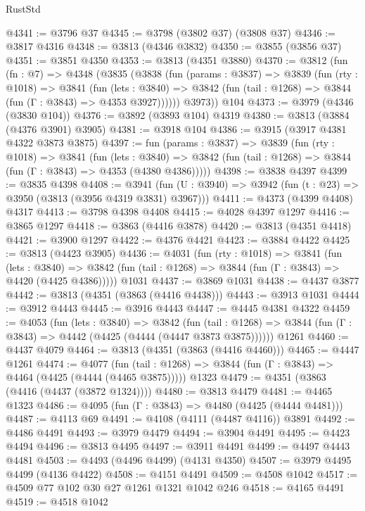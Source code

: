 \begin{lexlean}{RustStd}
\begin{coremodule}
@4341 := @3796 @37
@4345 := @3798 (@3802 @37) (@3808 @37)
@4346 := @3817 @4316
@4348 := @3813 (@4346 @3832)
@4350 := @3855 (@3856 @37)
@4351 := @3851 @4350
@4353 := @3813 (@4351 @3880)
@4370 := @3812
    (fun (fn : @7) =>
    @4348
      (@3835
        (@3838
          (fun (params : @3837) =>
          @3839
            (fun (rty : @1018) =>
            @3841
              (fun (lets : @3840) =>
              @3842 (fun (tail : @1268) => @3844 (fun (Γ : @3843) => @4353 @3927))))))
        @3973))
    @104
@4373 := @3979 (@4346 (@3830 @104))
@4376 := @3892 (@3893 @104) @4319
@4380 := @3813 (@3884 (@4376 @3901) @3905)
@4381 := @3918 @104
@4386 := @3915 (@3917 @4381 @4322 @3873 @3875)
@4397 := fun (params : @3837) =>
  @3839
    (fun (rty : @1018) =>
    @3841
      (fun (lets : @3840) =>
      @3842 (fun (tail : @1268) => @3844 (fun (Γ : @3843) => @4353 (@4380 @4386)))))
@4398 := @3838 @4397
@4399 := @3835 @4398
@4408 := @3941 (fun (U : @3940) => @3942 (fun (t : @23) => @3950 (@3813 (@3956 @4319 @3831) @3967)))
@4411 := @4373 (@4399 @4408) @4317
@4413 := @3798 @4398 @4408
@4415 := @4028 @4397 @1297
@4416 := @3865 @1297
@4418 := @3863 (@4416 @3878)
@4420 := @3813 (@4351 @4418)
@4421 := @3900 @1297
@4422 := @4376 @4421
@4423 := @3884 @4422
@4425 := @3813 (@4423 @3905)
@4436 := @4031
    (fun (rty : @1018) =>
    @3841
      (fun (lets : @3840) =>
      @3842 (fun (tail : @1268) => @3844 (fun (Γ : @3843) => @4420 (@4425 @4386)))))
    @1031
@4437 := @3869 @1031
@4438 := @4437 @3877
@4442 := @3813 (@4351 (@3863 (@4416 @4438)))
@4443 := @3913 @1031
@4444 := @3912 @4443
@4445 := @3916 @4443
@4447 := @4445 @4381 @4322
@4459 := @4053
    (fun (lets : @3840) =>
    @3842
      (fun (tail : @1268) => @3844 (fun (Γ : @3843) => @4442 (@4425 (@4444 (@4447 @3873 @3875))))))
    @1261
@4460 := @4437 @4079
@4464 := @3813 (@4351 (@3863 (@4416 @4460)))
@4465 := @4447 @1261
@4474 := @4077
    (fun (tail : @1268) => @3844 (fun (Γ : @3843) => @4464 (@4425 (@4444 (@4465 @3875)))))
    @1323
@4479 := @4351 (@3863 (@4416 (@4437 (@3872 @1324))))
@4480 := @3813 @4479
@4481 := @4465 @1323
@4486 := @4095 (fun (Γ : @3843) => @4480 (@4425 (@4444 @4481)))
@4487 := @4113 @69
@4491 := @4108 (@4111 (@4487 @4116)) @3891
@4492 := @4486 @4491
@4493 := @3979 @4479
@4494 := @3904 @4491
@4495 := @4423 @4494
@4496 := @3813 @4495
@4497 := @3911 @4491
@4499 := @4497 @4443 @4481
@4503 := @4493 (@4496 @4499) (@4131 @4350)
@4507 := @3979 @4495 @4499 (@4136 @4422)
@4508 := @4151 @4491
@4509 := @4508 @1042
@4517 := @4509 @77 @102 @30 @27 @1261 @1321 @1042 @246
@4518 := @4165 @4491
@4519 := @4518 @1042

\end{coremodule}
\end{lexlean}
